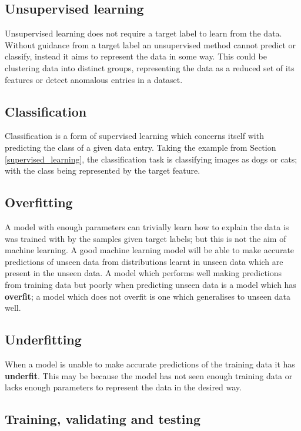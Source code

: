 \documentclass[
    author={Kai Hulme},
    supervisor={Dr Jon Bird},
    degree={BSc},
    title={Generative Adversarial Networks as an Augmentation Technique},
    subtitle={for Alzheimer's Disease Detection in MRI Volumes},
    type={Research},
    year={2021} 
]{dissertation}
\begin{document}
\subsection{Unsupervised learning}

Unsupervised learning does not require a target label to learn from the data. Without guidance from a target label an unsupervised method cannot predict or classify, instead it aims to represent the data in some way. This could be clustering data into distinct groups, representing the data as a reduced set of its features or detect anomalous entries in a dataset. 

\subsection{Classification}

Classification is a form of supervised learning which concerns itself with predicting the class of a given data entry. Taking the example from Section \ref{supervised_learning}, the classification task is classifying images as dogs or cats; with the class being represented by the target feature.

\subsection{Overfitting}

A model with enough parameters can trivially learn how to explain the data is was trained with by the samples given target labels; but this is not the aim of machine learning. A good machine learning model will be able to make accurate predictions of unseen data from distributions learnt in unseen data which are present in the unseen data. A model which performs well making predictions from training data but poorly when predicting unseen data is a model which has \textbf{overfit}; a model which does not overfit is one which generalises to unseen data well.

\subsection{Underfitting}

When a model is unable to make accurate predictions of the training data it has \textbf{underfit}. This may be because the model has not seen enough training data or lacks enough parameters to represent the data in the desired way.

\subsection{Training, validating and testing}
\label{train_val_test}
\end{document}
